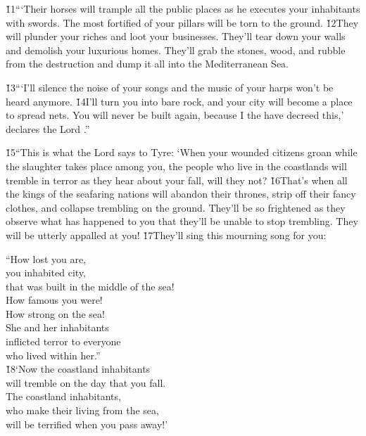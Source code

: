 \v{11}```Their horses will trample all the public places as he executes your inhabitants with swords. The most fortified of your pillars will be torn to the ground. \v{12}They will plunder your riches and loot your businesses. They'll tear down your walls and demolish your luxurious homes. They'll grab the stones, wood, and rubble from the destruction and dump it all into the Mediterranean Sea.

\v{13}```I'll silence the noise of your songs and the music of your harps won't be heard anymore. \v{14}I'll turn you into bare rock, and your city will become a place to spread nets. You will never be built again, because I the  have decreed this,' declares the Lord .''

\v{15}``This is what the Lord  says to Tyre: `When your wounded citizens groan while the slaughter takes place among you, the people who live in the coastlands will tremble in terror as they hear about your fall, will they not? \v{16}That's when all the kings of the seafaring nations will abandon their thrones, strip off their fancy clothes, and collapse trembling on the ground. They'll be so frightened as they observe what has happened to you that they'll be unable to stop trembling. They will be utterly appalled at you! \v{17}They'll sing this mourning song for you:

\begin{poetry}
\poeml ``How lost you are, \\
\poemll    you inhabited city, \\
\poemlll       that was built in the middle of the sea! \\
\poeml How famous you were! \\
\poemll    How strong on the sea! \\
\poeml She and her inhabitants \\
\poemll    inflicted terror to everyone \\
\poemlll       who lived within her.'' \\
\poeml \v{18}`Now the coastland inhabitants \\
\poemll    will tremble on the day that you fall. \\
\poeml The coastland inhabitants, \\
\poemll    who make their living from the sea, \\
\poemlll       will be terrified when you pass away!'
\end{poetry}

